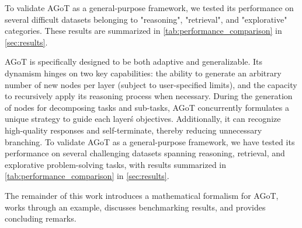 \documentclass{article}
\begin{document}
To validate AGoT as a general-purpose framework, we tested its performance on several difficult datasets belonging to "reasoning", "retrieval", and "explorative" categories. These results are summarized in \autoref{tab:performance_comparison} in \autoref{sec:results}.



AGoT is specifically designed to be both adaptive and generalizable. Its dynamism hinges on two key capabilities: the ability to generate an arbitrary number of new nodes per layer (subject to user-specified limits), and the capacity to recursively apply its reasoning process when necessary. During the generation of nodes for decomposing tasks and sub-tasks, AGoT concurrently formulates a unique strategy to guide each layer\'s objectives. Additionally, it can recognize high-quality responses and self-terminate, thereby reducing unnecessary branching. To validate AGoT as a general-purpose framework, we have tested its performance on several challenging datasets spanning reasoning, retrieval, and explorative problem-solving tasks, with results summarized in \cref{tab:performance_comparison} in \cref{sec:results}.


The remainder of this work introduces a mathematical formalism for AGoT, works through an example, discusses benchmarking results, and provides concluding remarks.
\end{document}

